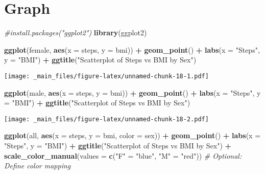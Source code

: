 \documentclass[
]{book}
\newenvironment{Shaded}{\begin{snugshade}}{\end{snugshade}}
\newcommand{\AttributeTok}[1]{\textcolor[rgb]{0.13,0.29,0.53}{#1}}
\newcommand{\CommentTok}[1]{\textcolor[rgb]{0.56,0.35,0.01}{\textit{#1}}}
\newcommand{\FunctionTok}[1]{\textcolor[rgb]{0.13,0.29,0.53}{\textbf{#1}}}
\newcommand{\NormalTok}[1]{#1}
\newcommand{\OtherTok}[1]{\textcolor[rgb]{0.56,0.35,0.01}{#1}}
\newcommand{\SpecialCharTok}[1]{\textcolor[rgb]{0.81,0.36,0.00}{\textbf{#1}}}
\newcommand{\StringTok}[1]{\textcolor[rgb]{0.31,0.60,0.02}{#1}}
\begin{document}
\hypertarget{graph}{%
\section{Graph}\label{graph}}

\begin{Shaded}
\begin{Highlighting}[]
\CommentTok{\#install.packages("ggplot2")}
\FunctionTok{library}\NormalTok{(ggplot2)}


\FunctionTok{ggplot}\NormalTok{(female, }\FunctionTok{aes}\NormalTok{(}\AttributeTok{x =}\NormalTok{ steps, }\AttributeTok{y =}\NormalTok{ bmi)) }\SpecialCharTok{+}
  \FunctionTok{geom\_point}\NormalTok{() }\SpecialCharTok{+}
  \FunctionTok{labs}\NormalTok{(}\AttributeTok{x =} \StringTok{"Steps"}\NormalTok{, }\AttributeTok{y =} \StringTok{"BMI"}\NormalTok{) }\SpecialCharTok{+}
  \FunctionTok{ggtitle}\NormalTok{(}\StringTok{"Scatterplot of Steps vs BMI by Sex"}\NormalTok{) }
\end{Highlighting}
\end{Shaded}

\texttt{[image: \_main\_files/figure-latex/unnamed-chunk-18-1.pdf]}

\begin{Shaded}
\begin{Highlighting}[]
\FunctionTok{ggplot}\NormalTok{(male, }\FunctionTok{aes}\NormalTok{(}\AttributeTok{x =}\NormalTok{ steps, }\AttributeTok{y =}\NormalTok{ bmi)) }\SpecialCharTok{+}
  \FunctionTok{geom\_point}\NormalTok{() }\SpecialCharTok{+}
  \FunctionTok{labs}\NormalTok{(}\AttributeTok{x =} \StringTok{"Steps"}\NormalTok{, }\AttributeTok{y =} \StringTok{"BMI"}\NormalTok{) }\SpecialCharTok{+}
  \FunctionTok{ggtitle}\NormalTok{(}\StringTok{"Scatterplot of Steps vs BMI by Sex"}\NormalTok{) }
\end{Highlighting}
\end{Shaded}

\texttt{[image: \_main\_files/figure-latex/unnamed-chunk-18-2.pdf]}

\begin{Shaded}
\begin{Highlighting}[]
\FunctionTok{ggplot}\NormalTok{(all, }\FunctionTok{aes}\NormalTok{(}\AttributeTok{x =}\NormalTok{ steps, }\AttributeTok{y =}\NormalTok{ bmi, }\AttributeTok{color =}\NormalTok{ sex)) }\SpecialCharTok{+}
  \FunctionTok{geom\_point}\NormalTok{() }\SpecialCharTok{+}
  \FunctionTok{labs}\NormalTok{(}\AttributeTok{x =} \StringTok{"Steps"}\NormalTok{, }\AttributeTok{y =} \StringTok{"BMI"}\NormalTok{) }\SpecialCharTok{+}
  \FunctionTok{ggtitle}\NormalTok{(}\StringTok{"Scatterplot of Steps vs BMI by Sex"}\NormalTok{) }\SpecialCharTok{+}
  \FunctionTok{scale\_color\_manual}\NormalTok{(}\AttributeTok{values =} \FunctionTok{c}\NormalTok{(}\StringTok{"F"} \OtherTok{=} \StringTok{"blue"}\NormalTok{, }\StringTok{"M"} \OtherTok{=} \StringTok{"red"}\NormalTok{))  }\CommentTok{\# Optional: Define color mapping}
\end{Highlighting}
\end{Shaded}
\end{document}
